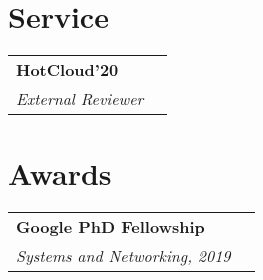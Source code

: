 \documentclass[margin,line]{res}
\begin{document}
\begin{resume}


\section{\sc Service}
\begin{tabular}{@{}p{5.5in}p{4in}}
{\bf HotCloud'20}\\
{\small\em External Reviewer}\\
\end{tabular}

\section{\sc Awards}
\begin{tabular}{@{}p{5.5in}p{4in}}
{\bf Google PhD Fellowship}\\
{\small\em Systems and Networking, 2019}\\
\end{tabular}

\end{resume}
\end{document}
